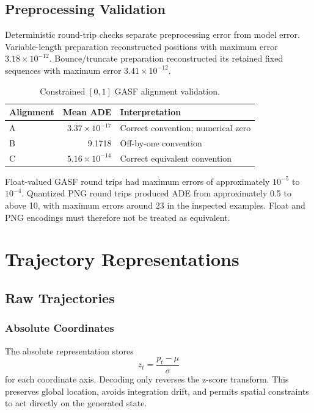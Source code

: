 \documentclass[12pt,a4paper,oneside]{report}
\begin{document}
\section{Preprocessing Validation}

Deterministic round-trip checks separate preprocessing error from model error. Variable-length preparation reconstructed positions with maximum error $3.18\times10^{-12}$. Bounce/truncate preparation reconstructed its retained fixed sequences with maximum error $3.41\times10^{-12}$.

\begin{table}[htbp]
\centering
\caption{Constrained $[0,1]$ GASF alignment validation.}
\label{tab:alignment}
\begin{tabular}{lrl}
\toprule
Alignment & Mean ADE & Interpretation \\
\midrule
A & $3.37\times10^{-17}$ & Correct convention; numerical zero \\
B & 9.1718 & Off-by-one convention \\
C & $5.16\times10^{-14}$ & Correct equivalent convention \\
\bottomrule
\end{tabular}
\end{table}

Float-valued GASF round trips had maximum errors of approximately $10^{-5}$ to $10^{-4}$. Quantized PNG round trips produced ADE from approximately 0.5 to above 10, with maximum errors around 23 in the inspected examples. Float and PNG encodings must therefore not be treated as equivalent.

\chapter{Trajectory Representations}
\label{chap:representations}

\section{Raw Trajectories}

\subsection{Absolute Coordinates}

The absolute representation stores
\[
z_t=\frac{p_t-\mu}{\sigma}
\]
for each coordinate axis. Decoding only reverses the z-score transform. This preserves global location, avoids integration drift, and permits spatial constraints to act directly on the generated state.
\end{document}
